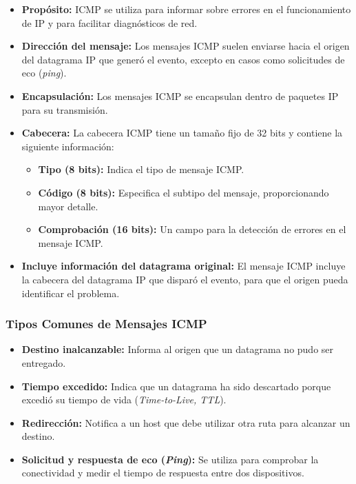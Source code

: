 \documentclass[a4paper,12pt]{article}
\begin{document}
\begin{itemize}
    \item \textbf{Propósito:} ICMP se utiliza para informar sobre errores en el funcionamiento de IP y para facilitar diagnósticos de red.
    \item \textbf{Dirección del mensaje:} Los mensajes ICMP suelen enviarse hacia el origen del datagrama IP que generó el evento, excepto en casos como solicitudes de eco (\textit{ping}).
    \item \textbf{Encapsulación:} Los mensajes ICMP se encapsulan dentro de paquetes IP para su transmisión.
    \item \textbf{Cabecera:} La cabecera ICMP tiene un tamaño fijo de 32 bits y contiene la siguiente información:
    \begin{itemize}
        \item \textbf{Tipo (8 bits):} Indica el tipo de mensaje ICMP.
        \item \textbf{Código (8 bits):} Especifica el subtipo del mensaje, proporcionando mayor detalle.
        \item \textbf{Comprobación (16 bits):} Un campo para la detección de errores en el mensaje ICMP.
    \end{itemize}
    \item \textbf{Incluye información del datagrama original:} El mensaje ICMP incluye la cabecera del datagrama IP que disparó el evento, para que el origen pueda identificar el problema.
\end{itemize}

\subsubsection*{Tipos Comunes de Mensajes ICMP}

\begin{itemize}
    \item \textbf{Destino inalcanzable:} Informa al origen que un datagrama no pudo ser entregado.
    \item \textbf{Tiempo excedido:} Indica que un datagrama ha sido descartado porque excedió su tiempo de vida (\textit{Time-to-Live, TTL}).
    \item \textbf{Redirección:} Notifica a un host que debe utilizar otra ruta para alcanzar un destino.
    \item \textbf{Solicitud y respuesta de eco (\textit{Ping}):} Se utiliza para comprobar la conectividad y medir el tiempo de respuesta entre dos dispositivos.
\end{itemize}
\end{document}
